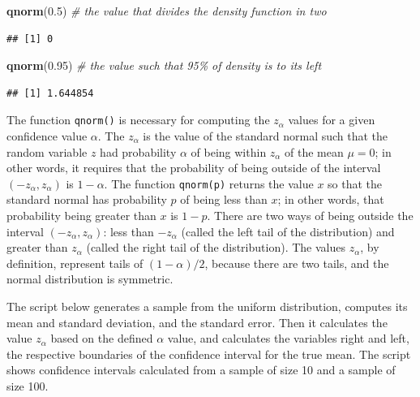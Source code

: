 \documentclass[
]{book}
\newenvironment{Shaded}{\begin{snugshade}}{\end{snugshade}}
\newcommand{\CommentTok}[1]{\textcolor[rgb]{0.56,0.35,0.01}{\textit{#1}}}
\newcommand{\FloatTok}[1]{\textcolor[rgb]{0.00,0.00,0.81}{#1}}
\newcommand{\KeywordTok}[1]{\textcolor[rgb]{0.13,0.29,0.53}{\textbf{#1}}}
\newcommand{\NormalTok}[1]{#1}
\theoremstyle{definition}
\theoremstyle{definition}
\theoremstyle{definition}
\theoremstyle{remark}
\begin{document}
\begin{Shaded}
\begin{Highlighting}[]
\KeywordTok{qnorm}\NormalTok{(}\FloatTok{0.5}\NormalTok{) }\CommentTok{\# the value that divides the density function in two}
\end{Highlighting}
\end{Shaded}

\begin{verbatim}
## [1] 0
\end{verbatim}

\begin{Shaded}
\begin{Highlighting}[]
\KeywordTok{qnorm}\NormalTok{(}\FloatTok{0.95}\NormalTok{) }\CommentTok{\# the value such that 95\% of density is to its left }
\end{Highlighting}
\end{Shaded}

\begin{verbatim}
## [1] 1.644854
\end{verbatim}

The function \texttt{qnorm()} is necessary for computing the \(z_\alpha\) values for a given confidence value \(\alpha\). The \(z_\alpha\) is the value of the standard normal such that the random variable \(z\) had probability \(\alpha\) of being within \(z_\alpha\) of the mean \(\mu=0\); in other words, it requires that the probability of being outside of the interval \((-z_\alpha, z_\alpha)\) is \(1-\alpha\). The function \texttt{qnorm(p)} returns the value \(x\) so that the standard normal has probability \(p\) of being less than \(x\); in other words, that probability being greater than \(x\) is \(1-p\). There are two ways of being outside the interval \((-z_\alpha, z_\alpha)\): less than \(-z_\alpha\) (called the left tail of the distribution) and greater than \(z_\alpha\) (called the right tail of the distribution). The values \(z_\alpha\), by definition, represent tails of \((1-\alpha)/2\), because there are two tails, and the normal distribution is symmetric.

The script below generates a sample from the uniform distribution, computes its mean and standard deviation, and the standard error. Then it calculates the value \(z_\alpha\) based on the defined \(\alpha\) value, and calculates the variables right and left, the respective boundaries of the confidence interval for the true mean. The script shows confidence intervals calculated from a sample of size 10 and a sample of size 100.
\end{document}
